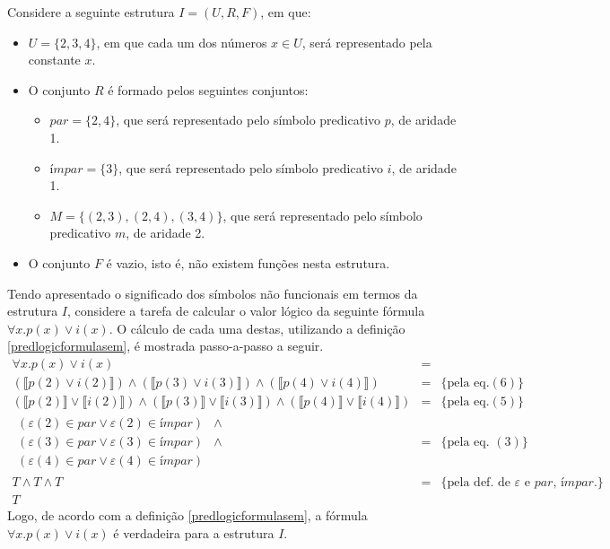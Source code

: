 \begin{Example}
Considere a seguinte estrutura $I=(U,R,F)$, em que:
\begin{itemize}
  \item $U = \{2,3,4\}$, em que cada um dos números $x \in U$, será
    representado pela constante $x$.
  \item O conjunto $R$ é formado pelos seguintes conjuntos:
  \begin{itemize}
    \item $par = \{2,4\}$, que será representado pelo símbolo
      predicativo $p$, de aridade 1.
    \item $\textit{ímpar} = \{3\}$, que será representado pelo símbolo
      predicativo $i$, de aridade 1.
    \item $M = \{(2,3),(2,4),(3,4)\}$, que será representado pelo
      símbolo predicativo $m$, de aridade 2.
  \end{itemize}
  \item O conjunto $F$ é vazio, isto é, não existem funções nesta estrutura.
\end{itemize}
Tendo apresentado o significado dos símbolos não funcionais em termos
da estrutura $I$, considere a tarefa de calcular o valor lógico da
seguinte fórmula $\forall x. p(x) \lor i(x)$. O cálculo de cada uma destas, utilizando a definição
\ref{predlogicformulasem}, é mostrada passo-a-passo a seguir.
\[
\begin{array}{lcl}
\forall x . p(x) \lor i(x) & = &\\
(\llbracket p(2)\lor i(2) \rrbracket) \land (\llbracket p(3)\lor i(3)
\rrbracket) \land (\llbracket p(4)\lor i(4) \rrbracket) & = &
\{\text{pela eq.} (6)\}\\
(\llbracket p(2) \rrbracket \lor \llbracket i(2) \rrbracket) \land
(\llbracket p(3) \rrbracket \lor \llbracket i(3)
\rrbracket) \land (\llbracket p(4) \rrbracket \lor \llbracket i(4) \rrbracket) & = &
\{\text{pela eq.} (5)\}\\
\begin{array}{lc}
(\varepsilon(2) \in \textit{par} \lor \varepsilon(2) \in
\textit{ímpar}) & \land \\
(\varepsilon(3) \in \textit{par} \lor \varepsilon(3) \in
\textit{ímpar}) & \land \\
(\varepsilon(4) \in \textit{par} \lor \varepsilon(4) \in
\textit{ímpar}) \end{array} & = & \{\text{pela eq. }(3)\} \\
T \land T \land T & = & \{\text{pela def. de }\varepsilon \text{ e }
\textit{par, ímpar}.\} \\
T
\end{array}
\]
Logo, de acordo com a definição \ref{predlogicformulasem}, a fórmula
$\forall x. p(x) \lor i(x)$ é verdadeira para a estrutura $I$.
\end{Example}
